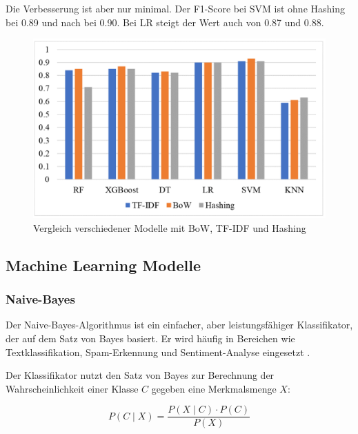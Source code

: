 Die Verbesserung ist aber nur minimal. Der F1-Score bei SVM ist ohne Hashing bei 0.89 und nach bei 0.90. 
Bei LR steigt der Wert auch von 0.87 und 0.88.

\begin{figure}[htbp]
    \begin{center}
        \includegraphics[scale=0.5]{static/bow_vs_tfidf_vs_hashing.png}
        \caption{\label{fig:vgl_bow_tfidf_hashing} Vergleich verschiedener Modelle mit BoW, TF-IDF und Hashing \cite{aslam2022}}
    \end{center}
\end{figure}

\subsection{Machine Learning Modelle}
\label{sec:ml_modelle}

\subsubsection{Naive-Bayes}

Der Naive-Bayes-Algorithmus ist ein einfacher, aber leistungsfähiger Klassifikator, der auf dem Satz von Bayes basiert. 
Er wird häufig in Bereichen wie Textklassifikation, Spam-Erkennung und Sentiment-Analyse eingesetzt \cite{zhang2004}.

Der Klassifikator nutzt den Satz von Bayes zur Berechnung der Wahrscheinlichkeit einer Klasse \( C \) gegeben eine Merkmalsmenge \( X \):

\begin{equation}
    P(C \mid X) = \frac{P(X \mid C) \cdot P(C)}{P(X)}
\end{equation}


